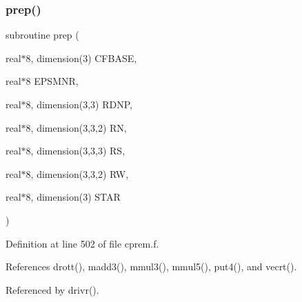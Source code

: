 \subsubsection{\texorpdfstring{prep()}{prep()}}
{\footnotesize\ttfamily subroutine prep (\begin{DoxyParamCaption}\item[{real$\ast$8, dimension(3)}]{C\+F\+B\+A\+SE,  }\item[{real$\ast$8}]{E\+P\+S\+M\+NR,  }\item[{real$\ast$8, dimension(3,3)}]{R\+D\+NP,  }\item[{real$\ast$8, dimension(3,3,2)}]{RN,  }\item[{real$\ast$8, dimension(3,3,3)}]{RS,  }\item[{real$\ast$8, dimension(3,3,2)}]{RW,  }\item[{real$\ast$8, dimension(3)}]{S\+T\+AR }\end{DoxyParamCaption})}



Definition at line 502 of file cprem.\+f.



References drott(), madd3(), mmul3(), mmul5(), put4(), and vecrt().



Referenced by drivr().

